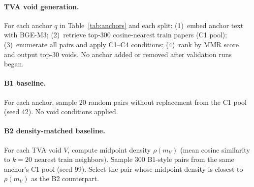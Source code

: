 \documentclass[11pt,twocolumn]{article}
\begin{document}
\paragraph{TVA void generation.}
For each anchor $q$ in Table~\ref{tab:anchors} and each split:
(1)~embed anchor text with BGE-M3;
(2)~retrieve top-300 cosine-nearest train papers (C1 pool);
(3)~enumerate all pairs and apply C1--C4 conditions;
(4)~rank by MMR score and output top-30 voids.
No anchor added or removed after validation runs began.

\begin{table}[h]
\centering\small
\caption{TVA anchor list (pre-specified, fixed across all splits).}
\label{tab:anchors}
\end{table}

\paragraph{B1 baseline.}
For each anchor, sample 20 random pairs without replacement from the C1 pool
(seed 42). No void conditions applied.

\paragraph{B2 density-matched baseline.}
For each TVA void $V$, compute midpoint density $\rho(m_V)$ (mean cosine
similarity to $k{=}20$ nearest train neighbors). Sample 300 B1-style pairs
from the same anchor's C1 pool (seed 99). Select the pair whose midpoint
density is closest to $\rho(m_V)$ as the B2 counterpart.
\end{document}
